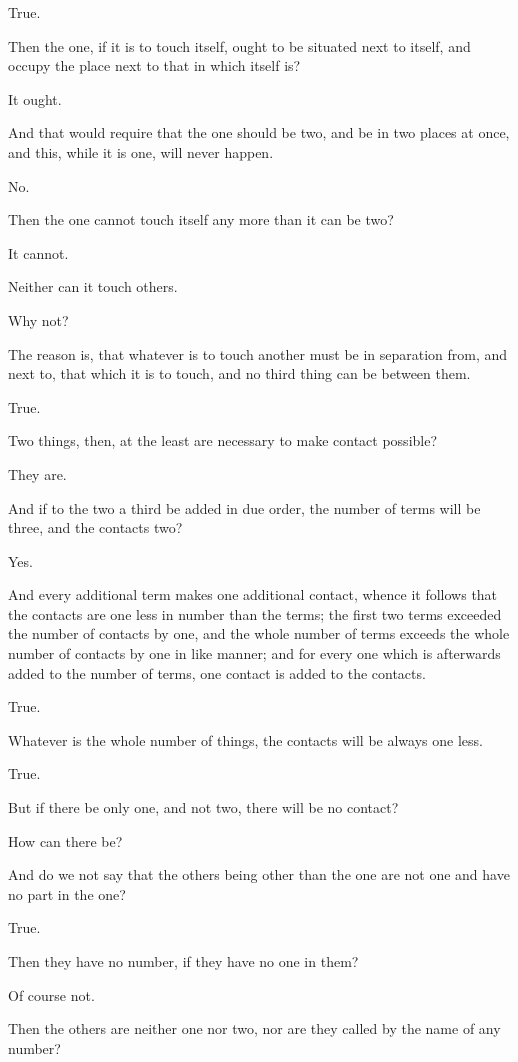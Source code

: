True.

Then the one, if it is to touch itself, ought to be situated next to
itself, and occupy the place next to that in which itself is?

It ought.

And that would require that the one should be two, and be in two places
at once, and this, while it is one, will never happen.

No.

Then the one cannot touch itself any more than it can be two?

It cannot.

Neither can it touch others.

Why not?

The reason is, that whatever is to touch another must be in separation
from, and next to, that which it is to touch, and no third thing can be
between them.

True.

Two things, then, at the least are necessary to make contact possible?

They are.

And if to the two a third be added in due order, the number of terms
will be three, and the contacts two?

Yes.

And every additional term makes one additional contact, whence it
follows that the contacts are one less in number than the terms; the
first two terms exceeded the number of contacts by one, and the whole
number of terms exceeds the whole number of contacts by one in like
manner; and for every one which is afterwards added to the number of
terms, one contact is added to the contacts.

True.

Whatever is the whole number of things, the contacts will be always one
less.

True.

But if there be only one, and not two, there will be no contact?

How can there be?

And do we not say that the others being other than the one are not one
and have no part in the one?

True.

Then they have no number, if they have no one in them?

Of course not.

Then the others are neither one nor two, nor are they called by the name
of any number?


